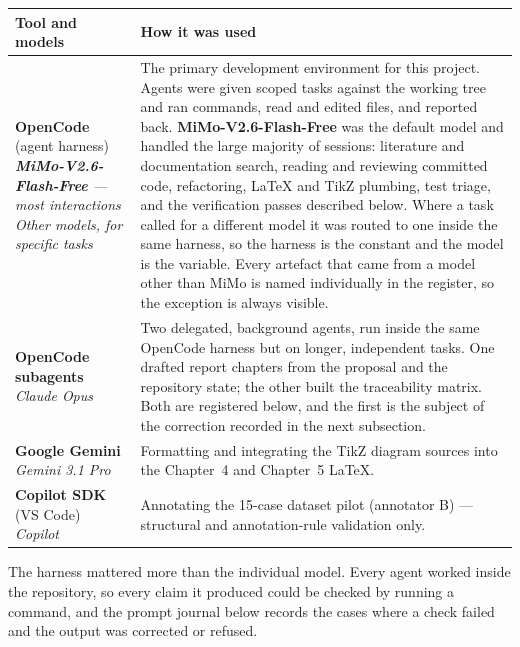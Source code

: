 \begin{longtable}{>{\raggedright\arraybackslash}p{}>{\raggedright\arraybackslash}p{}}
\toprule
\textbf{Tool and models} & \textbf{How it was used} \\
\midrule
\endhead
\textbf{OpenCode} (agent harness)\newline
  \emph{\textbf{MiMo-V2.6-Flash-Free} --- most interactions}\newline
  \emph{Other models, for specific tasks} &
  The primary development environment for this project. Agents were given
  scoped tasks against the working tree and ran commands, read and edited
  files, and reported back. \textbf{MiMo-V2.6-Flash-Free} was the default model
  and handled the large majority of sessions: literature and documentation
  search, reading and reviewing committed code, refactoring, LaTeX and TikZ
  plumbing, test triage, and the verification passes described below. Where a
  task called for a different model it was routed to one inside the same
  harness, so the harness is the constant and the model is the variable. Every
  artefact that came from a model other than MiMo is named individually in the
  register, so the exception is always visible. \\
\textbf{OpenCode subagents}\newline
  \emph{Claude Opus} &
  Two delegated, background agents, run inside the same OpenCode harness but
  on longer, independent tasks. One drafted report chapters from the proposal
  and the repository state; the other built the traceability matrix. Both are
  registered below, and the first is the subject of the correction recorded in
  the next subsection. \\
\textbf{Google Gemini}\newline
  \emph{Gemini 3.1 Pro} &
  Formatting and integrating the TikZ diagram sources into the Chapter~4 and
  Chapter~5 LaTeX. \\
\textbf{Copilot SDK} (VS Code)\newline
  \emph{Copilot} &
  Annotating the 15-case dataset pilot (annotator B) --- structural and
  annotation-rule validation only. \\
\bottomrule
\end{longtable}

\noindent The harness mattered more than the individual model. Every agent
worked inside the repository, so every claim it produced could be checked by
running a command, and the prompt journal below records the cases where a
check failed and the output was corrected or refused.


